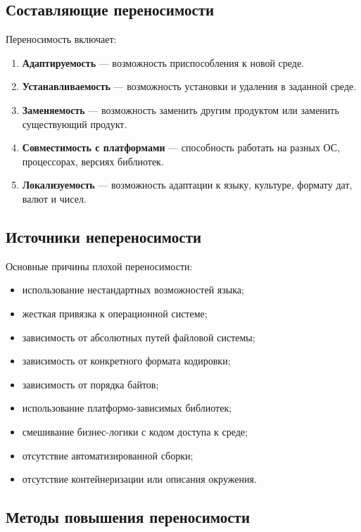\documentclass[12pt,a4paper]{article}
\begin{document}
\subsection{Составляющие переносимости}

Переносимость включает:

\begin{enumerate}
    \item \textbf{Адаптируемость} --- возможность приспособления к новой среде.
    \item \textbf{Устанавливаемость} --- возможность установки и удаления в заданной среде.
    \item \textbf{Заменяемость} --- возможность заменить другим продуктом или заменить существующий продукт.
    \item \textbf{Совместимость с платформами} --- способность работать на разных ОС, процессорах, версиях библиотек.
    \item \textbf{Локализуемость} --- возможность адаптации к языку, культуре, формату дат, валют и чисел.
\end{enumerate}

\subsection{Источники непереносимости}

Основные причины плохой переносимости:
\begin{itemize}
    \item использование нестандартных возможностей языка;
    \item жесткая привязка к операционной системе;
    \item зависимость от абсолютных путей файловой системы;
    \item зависимость от конкретного формата кодировки;
    \item зависимость от порядка байтов;
    \item использование платформо-зависимых библиотек;
    \item смешивание бизнес-логики с кодом доступа к среде;
    \item отсутствие автоматизированной сборки;
    \item отсутствие контейнеризации или описания окружения.
\end{itemize}

\subsection{Методы повышения переносимости}
\end{document}
